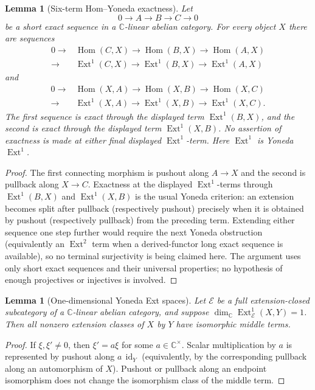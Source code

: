 \documentclass[12pt,leqno]{amsart}
\numberwithin{equation}{section}
\newtheorem{lem}[thm]{Lemma}
\newcommand{\Hom}{\operatorname{Hom}}
\newcommand{\Ext}{\operatorname{Ext}}
\newcommand{\id}{\operatorname{id}}
\def\C{\mathbb{C}}
\begin{document}
\begin{lem}[Six-term Hom--Yoneda exactness]
\label{lem:prelim-Hom-Yoneda}
Let
\[
 0\longrightarrow A\longrightarrow B\longrightarrow C\longrightarrow0
\]
be a short exact sequence in a $\C$-linear abelian category.  For every
object $X$ there are sequences
\[
\begin{aligned}
0\longrightarrow&\Hom(C,X)\longrightarrow\Hom(B,X)
 \longrightarrow\Hom(A,X)\\
 \longrightarrow&\Ext^1(C,X)\longrightarrow\Ext^1(B,X)
 \longrightarrow\Ext^1(A,X)
\end{aligned}
\]
and
\[
\begin{aligned}
0\longrightarrow&\Hom(X,A)\longrightarrow\Hom(X,B)
 \longrightarrow\Hom(X,C)\\
 \longrightarrow&\Ext^1(X,A)\longrightarrow\Ext^1(X,B)
 \longrightarrow\Ext^1(X,C).
\end{aligned}
\]
The first sequence is exact through the displayed term
$\Ext^1(B,X)$, and the second is exact through the displayed term
$\Ext^1(X,B)$.  No assertion of exactness is made at either final
displayed $\Ext^1$-term.  Here $\Ext^1$ is Yoneda $\Ext^1$.
\end{lem}

\begin{proof}
The first connecting morphism is pushout along $A\to X$ and the second
is pullback along $X\to C$.  Exactness at the displayed $\Ext^1$-terms
through $\Ext^1(B,X)$ and $\Ext^1(X,B)$ is the usual Yoneda criterion:
an extension becomes split after pullback (respectively pushout) precisely
when it is obtained by pushout (respectively pullback) from the preceding
term.  Extending either sequence one step further would require the next
Yoneda obstruction (equivalently an $\Ext^2$ term when a derived-functor
long exact sequence is available), so no terminal surjectivity is being
claimed here.  The argument uses only short exact sequences and their
universal properties; no hypothesis of enough projectives or injectives
is involved.
\end{proof}

\begin{lem}[One-dimensional Yoneda Ext spaces]\label{lem:one-dimensional-ext}
Let $\mathscr E$ be a full extension-closed subcategory of a $\C$-linear
abelian category, and suppose
$\dim_\C\Ext^1_{\mathscr E}(X,Y)=1$.  Then all nonzero extension classes
of $X$ by $Y$ have isomorphic middle terms.
\end{lem}

\begin{proof}
If $\xi,\xi'\neq0$, then $\xi'=a\xi$ for some $a\in\C^\times$.
Scalar multiplication by $a$ is represented by pushout along
$a\,\id_Y$ (equivalently, by the corresponding pullback along an
automorphism of $X$).  Pushout or pullback along an endpoint
isomorphism does not change the isomorphism class of the middle term.
\end{proof}
\end{document}

